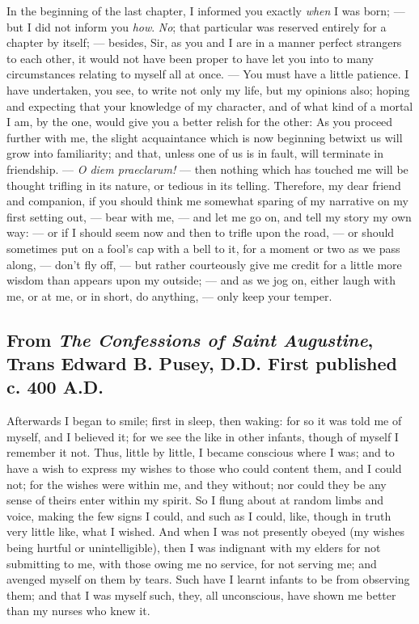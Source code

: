 \documentclass[
]{memoir}
\begin{document}
In the beginning of the last chapter, I informed you exactly \emph{when}
I was born; --- but I did not inform you \emph{how}. \emph{No}; that
particular was reserved entirely for a chapter by itself; --- besides,
Sir, as you and I are in a manner perfect strangers to each other, it
would not have been proper to have let you into to many circumstances
relating to myself all at once. --- You must have a little patience. I
have undertaken, you see, to write not only my life, but my opinions
also; hoping and expecting that your knowledge of my character, and of
what kind of a mortal I am, by the one, would give you a better relish
for the other: As you proceed further with me, the slight acquaintance
which is now beginning betwixt us will grow into familiarity; and that,
unless one of us is in fault, will terminate in friendship. --- \emph{O
diem praeclarum!} --- then nothing which has touched me will be thought
trifling in its nature, or tedious in its telling. Therefore, my dear
friend and companion, if you should think me somewhat sparing of my
narrative on my first setting out, --- bear with me, --- and let me go
on, and tell my story my own way: --- or if I should seem now and then
to trifle upon the road, --- or should sometimes put on a fool's cap
with a bell to it, for a moment or two as we pass along, --- don't fly
off, --- but rather courteously give me credit for a little more wisdom
than appears upon my outside; --- and as we jog on, either laugh with
me, or at me, or in short, do anything, --- only keep your temper.

\hypertarget{from-the-confessions-of-saint-augustine-trans-edward-b.-pusey-d.d.-first-published-c.-400-a.d.}{%
\subsection*{\texorpdfstring{From \emph{The Confessions of Saint
Augustine}, Trans Edward B. Pusey, D.D. First published c. 400
A.D.}{From The Confessions of Saint Augustine, Trans Edward B. Pusey, D.D. First published c. 400 A.D.}}\label{from-the-confessions-of-saint-augustine-trans-edward-b.-pusey-d.d.-first-published-c.-400-a.d.}}

Afterwards I began to smile; first in sleep, then waking: for so it was
told me of myself, and I believed it; for we see the like in other
infants, though of myself I remember it not. Thus, little by little, I
became conscious where I was; and to have a wish to express my wishes to
those who could content them, and I could not; for the wishes were
within me, and they without; nor could they be any sense of theirs enter
within my spirit. So I flung about at random limbs and voice, making the
few signs I could, and such as I could, like, though in truth very
little like, what I wished. And when I was not presently obeyed (my
wishes being hurtful or unintelligible), then I was indignant with my
elders for not submitting to me, with those owing me no service, for not
serving me; and avenged myself on them by tears. Such have I learnt
infants to be from observing them; and that I was myself such, they, all
unconscious, have shown me better than my nurses who knew it.
\end{document}
